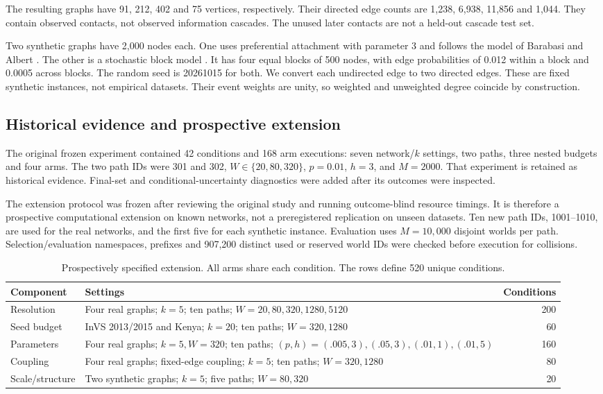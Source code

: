 \documentclass[smallextended]{svjour3}
\begin{document}
The resulting graphs have 91, 212, 402 and 75 vertices, respectively. Their directed edge counts are 1,238, 6,938, 11,856 and 1,044. They contain observed contacts, not observed information cascades. The unused later contacts are not a held-out cascade test set.

Two synthetic graphs have 2,000 nodes each. One uses preferential attachment with parameter 3 and follows the model of Barabasi and Albert \cite{ref17}. The other is a stochastic block model \cite{ref18}. It has four equal blocks of 500 nodes, with edge probabilities of 0.012 within a block and 0.0005 across blocks. The random seed is 20261015 for both. We convert each undirected edge to two directed edges. These are fixed synthetic instances, not empirical datasets. Their event weights are unity, so weighted and unweighted degree coincide by construction.

\subsection{Historical evidence and prospective extension}
The original frozen experiment contained 42 conditions and 168 arm executions: seven network/$k$ settings, two paths, three nested budgets and four arms. The two path IDs were 301 and 302, $W\in\{20,80,320\}$, $p=0.01$, $h=3$, and $M=2000$. That experiment is retained as historical evidence. Final-set and conditional-uncertainty diagnostics were added after its outcomes were inspected.

The extension protocol was frozen after reviewing the original study and running outcome-blind resource timings. It is therefore a prospective computational extension on known networks, not a preregistered replication on unseen datasets. Ten new path IDs, 1001--1010, are used for the real networks, and the first five for each synthetic instance. Evaluation uses $M=10,000$ disjoint worlds per path. Selection/evaluation namespaces, prefixes and 907,200 distinct used or reserved world IDs were checked before execution for collisions.

\begin{table}[t]
\caption{Prospectively specified extension. All arms share each condition. The rows define 520 unique conditions.}\label{tab:matrix}
\begin{tabularx}{\linewidth}{lXr}
\toprule
Component & Settings & Conditions \\
\midrule
Resolution & Four real graphs; $k=5$; ten paths; $W=20,80,320,1280,5120$ & 200 \\
Seed budget & InVS 2013/2015 and Kenya; $k=20$; ten paths; $W=320,1280$ & 60 \\
Parameters & Four real graphs; $k=5,W=320$; ten paths; $(p,h)=(.005,3),(.05,3),(.01,1),(.01,5)$ & 160 \\
Coupling & Four real graphs; fixed-edge coupling; $k=5$; ten paths; $W=320,1280$ & 80 \\
Scale/structure & Two synthetic graphs; $k=5$; five paths; $W=80,320$ & 20 \\
\bottomrule
\end{tabularx}
\end{table}
\end{document}
